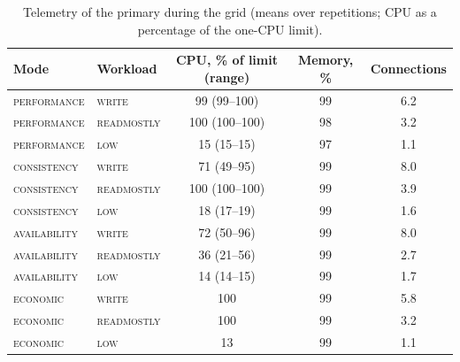 \begin{table}[t]
\centering\footnotesize
\begin{tabular}{llccc}
\toprule
Mode & Workload & CPU, \% of limit (range) & Memory, \% & Connections \\
\midrule
\textsc{performance} & \textsc{write} & 99 (99--100) & 99 & 6.2 \\
\textsc{performance} & \textsc{readmostly} & 100 (100--100) & 98 & 3.2 \\
\textsc{performance} & \textsc{low} & 15 (15--15) & 97 & 1.1 \\
\addlinespace
\textsc{consistency} & \textsc{write} & 71 (49--95) & 99 & 8.0 \\
\textsc{consistency} & \textsc{readmostly} & 100 (100--100) & 99 & 3.9 \\
\textsc{consistency} & \textsc{low} & 18 (17--19) & 99 & 1.6 \\
\addlinespace
\textsc{availability} & \textsc{write} & 72 (50--96) & 99 & 8.0 \\
\textsc{availability} & \textsc{readmostly} & 36 (21--56) & 99 & 2.7 \\
\textsc{availability} & \textsc{low} & 14 (14--15) & 99 & 1.7 \\
\addlinespace
\textsc{economic} & \textsc{write} & 100 & 99 & 5.8 \\
\textsc{economic} & \textsc{readmostly} & 100 & 99 & 3.2 \\
\textsc{economic} & \textsc{low} & 13 & 99 & 1.1 \\
\bottomrule
\end{tabular}
\caption{Telemetry of the primary during the grid (means over repetitions; CPU as a percentage of the one-CPU limit).}
\label{tab:telemetry}
\end{table}
